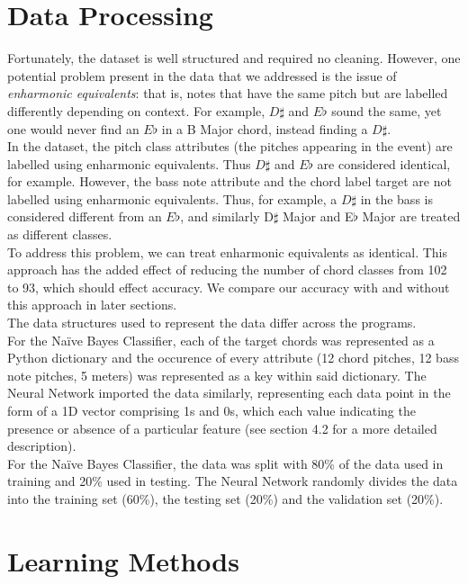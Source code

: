 \documentclass[a4paper]{article}
\begin{document}
\section{Data Processing}
Fortunately, the dataset is well structured and required no cleaning. However, one potential problem present in the data that we addressed is the issue of \textit{enharmonic equivalents}: that is, notes that have the same pitch but are labelled differently depending on context. For example, $D\sharp$ and $E\flat$ sound the same, yet one would never find an $E\flat$ in a B Major chord, instead finding a $D\sharp$. 
\\[12pt]
In the dataset, the pitch class attributes (the pitches appearing in the event) are labelled using enharmonic equivalents. Thus $D\sharp$ and $E\flat$ are considered identical, for example. However, the bass note attribute and the chord label target are not labelled using enharmonic equivalents. Thus, for example, a $D\sharp$ in the bass is considered different from an $E\flat$, and similarly D$\sharp$ Major and E$\flat$ Major are treated as different classes.
\\[12pt]
To address this problem, we can treat enharmonic equivalents as identical. This approach has the added effect of reducing the number of chord classes from 102 to 93, which should effect accuracy. We compare our accuracy with and without this approach in later sections.
\\[12pt]
The data structures used to represent the data differ across the programs.
\\[12pt]
For the Naïve Bayes Classifier, each of the target chords was represented as a Python dictionary and the occurence of every attribute (12 chord pitches, 12 bass note pitches, 5 meters) was represented as a key within said dictionary.
The Neural Network imported the data similarly, representing each data point in the form of a 1D vector comprising 1s and 0s, which each value indicating the presence or absence of a particular feature (see section 4.2 for a more detailed description).
\\[12pt]
For the Naïve Bayes Classifier, the data was split with 80\% of the data used in training and 20\% used in testing. The Neural Network randomly divides the data into the training set (60\%), the testing set (20\%) and the validation set (20\%).
\section{Learning Methods}
\end{document}
